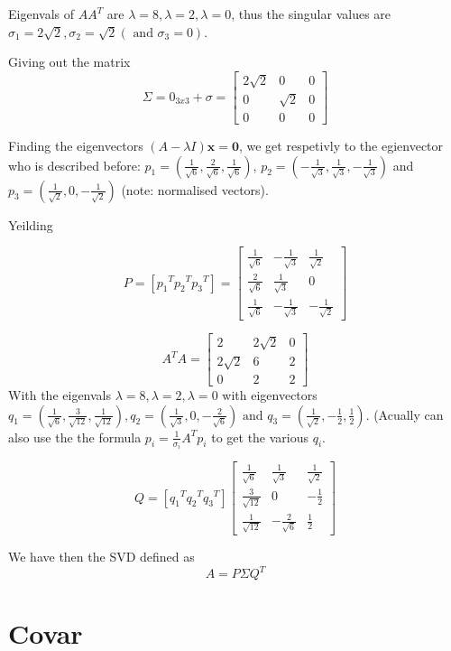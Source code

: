 \documentclass[a4paper]{article}
\begin{document}
Eigenvals of $A A^{T}$ are $\lambda=8, \lambda=2, \lambda=0$, thus the singular values
 are $\sigma_{1}=2 \sqrt{2}, \sigma_{2}=\sqrt{2}\left(\text { and } \sigma_{3}=0\right)$.


Giving out the matrix
$$
\Sigma= 0_{3x3}+\sigma=
\left[\begin{array}{ccc}{2 \sqrt{2}} & {0} & {0} \\ {0} & {\sqrt{2}} & {0} \\ {0} & {0} & {0}\end{array}\right]
$$


Finding the eigenvectors $(A-\lambda I) \mathbf{x}=\mathbf{0}$, we get respetivly to the egienvector
 who is described before: $p_{1}=\left(\frac{1}{\sqrt{6}}, \frac{2}{\sqrt{6}}, \frac{1}{\sqrt{6}}\right)$,
 $p_{2}=\left(-\frac{1}{\sqrt{3}}, \frac{1}{\sqrt{3}},-\frac{1}{\sqrt{3}}\right)$ and 
$p_{3}=\left(\frac{1}{\sqrt{2}}, 0,-\frac{1}{\sqrt{2}}\right)$ (note: normalised vectors).

Yeilding

$$
P= \left[  {p_1}^T {p_2}^T {p_3}^T     \right]
=\left[\begin{array}{ccc}{\frac{1}{\sqrt{6}}} & {-\frac{1}{\sqrt{3}}} & {\frac{1}{\sqrt{2}}} \\ {\frac{2}{\sqrt{6}}} & {\frac{1}{\sqrt{3}}} & {0} \\ {\frac{1}{\sqrt{6}}} & {-\frac{1}{\sqrt{3}}} & {-\frac{1}{\sqrt{2}}}\end{array}\right]
$$




$$
A^{T} A=\left[\begin{array}{ccc}{2} & {2 \sqrt{2}} & {0} \\ {2 \sqrt{2}} & {6} & {2} \\ {0} & {2} & {2}\end{array}\right]
$$
With the eigenvals $\lambda=8, \lambda=2, \lambda=0$ with eigenvectors
$q_{1}=\left(\frac{1}{\sqrt{6}}, \frac{3}{\sqrt{12}}, \frac{1}{\sqrt{12}}\right), q_{2}=\left(\frac{1}{\sqrt{3}}, 0,-\frac{2}{\sqrt{6}}\right) \text { and } q_{3}=\left(\frac{1}{\sqrt{2}},-\frac{1}{2}, \frac{1}{2}\right)$. (Acually
 can also use the the formula $p_{i}=\frac{1}{\sigma_{i}} A^{T} p_{i}$ to get the various $q_i$.


$$
Q=\left[  {q_1}^T {q_2}^T {q_3}^T     \right]
\left[\begin{array}{ccc}{\frac{1}{\sqrt{6}}} & {\frac{1}{\sqrt{3}}} & {\frac{1}{\sqrt{2}}} \\ {\frac{3}{\sqrt{12}}} & {0} & {-\frac{1}{2}} \\ {\frac{1}{\sqrt{12}}} & {-\frac{2}{\sqrt{6}}} & {\frac{1}{2}}\end{array}\right]
$$


We have then the SVD defined as
$$
A=P \Sigma Q^{T}
$$

\section{Covar}
\label{sec-3}
\end{document}
